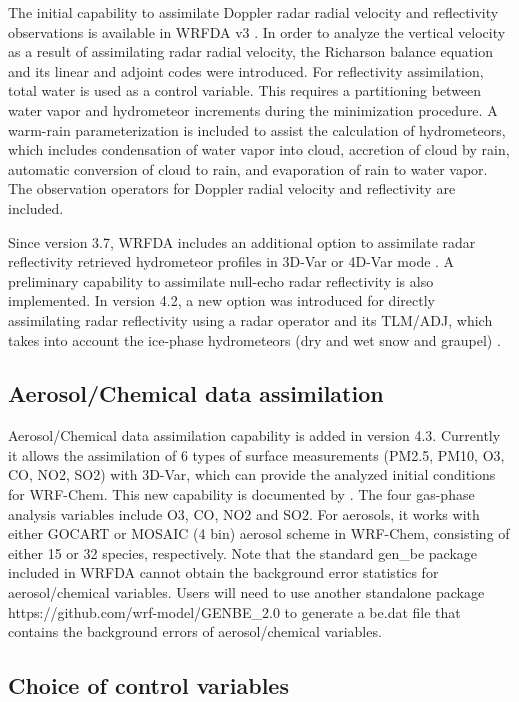 The initial capability to assimilate Doppler radar radial velocity and reflectivity observations is available in WRFDA v3
\citep{xiao05, xiao07, xiao072, xiao08}. In order to analyze the vertical velocity as a result of
assimilating radar radial velocity, the Richarson balance equation
 and its linear and adjoint codes were introduced.
For reflectivity assimilation, total water is used as a control variable. 
This requires a partitioning between water vapor and hydrometeor increments during the minimization procedure.
A warm-rain parameterization is included to assist the calculation of hydrometeors, which includes condensation of water vapor
into cloud, accretion of cloud by rain, automatic conversion of cloud to rain, and evaporation of rain to water vapor.
The observation operators for Doppler radial velocity and reflectivity are included.

Since version 3.7, WRFDA includes an additional option to assimilate radar reflectivity retrieved hydrometeor profiles 
in 3D-Var or 4D-Var mode \citep{wang13a, wang13b, sun13}. A preliminary capability to assimilate 
null-echo radar reflectivity is also implemented. In version 4.2, a new option was introduced for directly assimilating radar reflectivity 
using a radar operator and its TLM/ADJ, which takes into account the ice-phase hydrometeors (dry and wet snow and graupel) \citep{wang19}. 

\subsection{Aerosol/Chemical data assimilation}

Aerosol/Chemical data assimilation capability is added in version 4.3. Currently it allows the assimilation of 6 types of surface measurements (PM2.5, PM10, O3, CO, NO2, SO2) with 3D-Var, which can provide the analyzed initial conditions for WRF-Chem. 
This new capability is documented by \citet{sun20}. The four gas-phase analysis variables include O3, CO, NO2 and SO2. 
For aerosols, it works with either GOCART or MOSAIC (4 bin) aerosol scheme in WRF-Chem, consisting of either 15 or 32 species, respectively. Note that the standard gen\_be package included in WRFDA cannot obtain the background error statistics for aerosol/chemical variables. Users will need to use another standalone package https://github.com/wrf-model/GENBE\_2.0 to generate a be.dat file that contains the background errors of aerosol/chemical variables.

\subsection{Choice of control variables}
\label{var-cvs}


